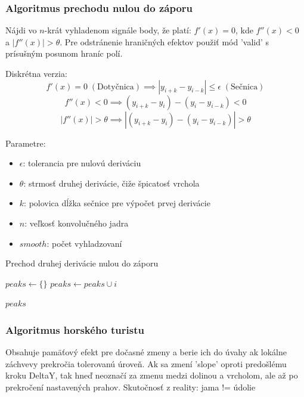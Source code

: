 \subsubsection{Algoritmus prechodu nulou do záporu}
Nájdi vo $n$-krát vyhladenom signále body, že platí: $f'(x) = 0$, kde $f''(x) < 0$ a $|f''(x)| > \theta$. Pre odstránenie hraničných efektov použiť mód 'valid' s prísušným posunom hraníc polí.

Diskrétna verzia:
$$f'(x) = 0 \; \mathrm{(Dotyčnica)} \implies |y_{i+k} - y_{i-k}| \leq \epsilon \;\mathrm{(Sečnica)}$$
$$f''(x) < 0 \implies (y_{i+k} - y_i) - (y_i - y_{i-k}) < 0$$
$$|f''(x)| > \theta \implies |(y_{i+k} - y_i) - (y_i - y_{i-k})| > \theta$$

Parametre:
\begin{itemize}
\item $\epsilon$: tolerancia pre nulovú deriváciu
\item $\theta$: strmosť druhej derivácie, čiže špicatosť vrchola
\item $k$: polovica dĺžka sečnice pre výpočet prvej derivácie
\item $n$: veľkosť konvolučného jadra
\item $smooth$: počet vyhladzovaní
\end{itemize}

\begin{algorithm}
\caption{Prechod druhej derivácie nulou do záporu}
\begin{algorithmic}[1]
	\State $peaks \gets \{\}$
		    \State $peaks \gets peaks \cup i$
		
		\EndIf
	\EndFor
	\State \Return $peaks$
\EndFunction
\end{algorithmic}
\end{algorithm}

\subsubsection{Algoritmus horského turistu}
Obsahuje pamäťový efekt pre dočasné zmeny a berie ich do úvahy ak lokálne záchvevy prekročia tolerovanú úroveň. Ak sa zmení 'slope' oproti predošlému kroku DeltaY, tak hneď neoznačí za zmenu medzi dolinou a vrcholom, ale až po prekročení nastavených prahov. Skutočnosť z reality: jama != údolie 
\cite{peek-mountaineer-method}


